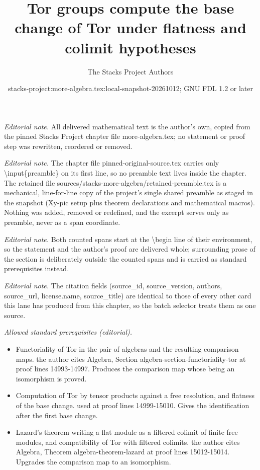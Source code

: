\documentclass[10pt,a4paper]{amsart}
\title{Tor groups compute the base change of Tor under flatness and colimit hypotheses}
\author{The Stacks Project Authors}
\date{stacks-project:more-algebra.tex:local-snapshot-20261012; GNU FDL 1.2 or later}
\theoremstyle{plain}
\theoremstyle{definition}
\theoremstyle{remark}
\numberwithin{equation}{subsection}
\begin{document}
\maketitle
\setcounter{subsection}{1}
\noindent\textit{Editorial note.} All delivered mathematical text is the author's own, copied from the pinned Stacks Project chapter file more-algebra.tex; no statement or proof step was rewritten, reordered or removed.\par\medskip
\noindent\textit{Editorial note.} The chapter file pinned-original-source.tex carries only \textbackslash{}input\{preamble\} on its first line, so no preamble text lives inside the chapter. The retained file sources/stacks-more-algebra/retained-preamble.tex is a mechanical, line-for-line copy of the project's single shared preamble as staged in the snapshot (Xy-pic setup plus theorem declarations and mathematical macros). Nothing was added, removed or redefined, and the excerpt serves only as preamble, never as a span coordinate.\par\medskip
\noindent\textit{Editorial note.} Both counted spans start at the \textbackslash{}begin line of their environment, so the statement and the author's proof are delivered whole; surrounding prose of the section is deliberately outside the counted spans and is carried as standard prerequisites instead.\par\medskip
\noindent\textit{Editorial note.} The citation fields (source\_id, source\_version, authors, source\_url, license.name, source\_title) are identical to those of every other card this lane has produced from this chapter, so the batch selector treats them as one source.\par\medskip
\noindent\textit{Allowed standard prerequisites (editorial).}\begin{itemize}
\item Functoriality of Tor in the pair of algebras and the resulting comparison maps. the author cites Algebra, Section algebra-section-functoriality-tor at proof lines 14993-14997. Produces the comparison map whose being an isomorphism is proved.
\item Computation of Tor by tensor products against a free resolution, and flatness of the base change. used at proof lines 14999-15010. Gives the identification after the first base change.
\item Lazard's theorem writing a flat module as a filtered colimit of finite free modules, and compatibility of Tor with filtered colimits. the author cites Algebra, Theorem algebra-theorem-lazard at proof lines 15012-15014. Upgrades the comparison map to an isomorphism.
\end{itemize}\medskip
\end{document}
